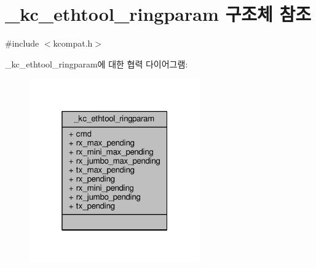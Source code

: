 \hypertarget{struct__kc__ethtool__ringparam}{}\section{\+\_\+kc\+\_\+ethtool\+\_\+ringparam 구조체 참조}
\label{struct__kc__ethtool__ringparam}


{\ttfamily \#include $<$kcompat.\+h$>$}



\+\_\+kc\+\_\+ethtool\+\_\+ringparam에 대한 협력 다이어그램\+:
\nopagebreak
\begin{figure}[H]
\begin{center}
\leavevmode
\includegraphics[width=208pt]{struct__kc__ethtool__ringparam__coll__graph}
\end{center}
\end{figure}

